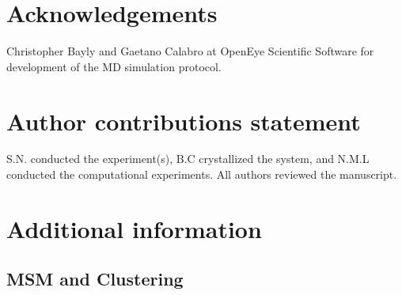 \documentclass[fleqn,10pt]{wlscirep}
\begin{document}


\section{Acknowledgements}

Christopher Bayly and Gaetano Calabro at OpenEye Scientific Software for development of the MD simulation protocol.

\section{Author contributions statement}

S.N. conducted the experiment(s),  B.C crystallized the system, and N.M.L conducted the computational experiments.  All authors reviewed the manuscript. 

\section{Additional information}

\subsection{MSM and Clustering}
\end{document}
